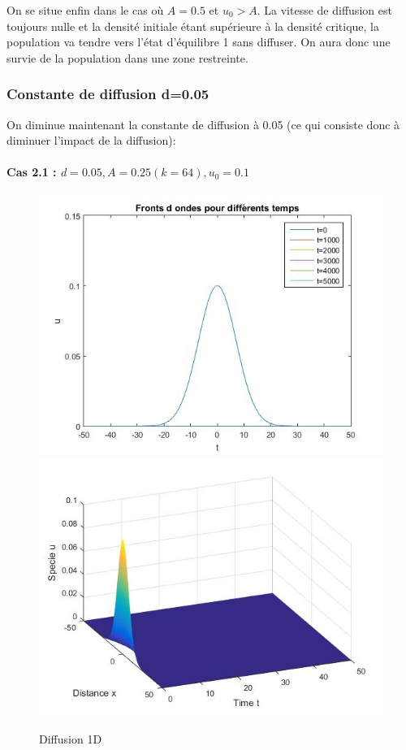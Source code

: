 \documentclass[a4paper,11pt]{article}
\begin{document}
On se situe enfin dans le cas où $A=0.5$ et $u_0>A$. La vitesse de diffusion est toujours nulle et la densité initiale étant supérieure à la densité critique, la population va tendre vers l'état d'équilibre 1 sans diffuser. On aura donc une survie de la population dans une zone restreinte.

\subsubsection{Constante de diffusion d=0.05}
On diminue maintenant la constante de diffusion à 0.05 (ce qui consiste donc à diminuer l'impact de la diffusion):

\paragraph{Cas 2.1 : $d=0.05, A=0.25 (k=64), u_0=0.1$}
\noindent
\begin{figure}[H]
	\centering
	\includegraphics[width=0.40\linewidth]{Allee/F2211}\hfill
	\includegraphics[width=0.55\linewidth]{Allee/F4211}
    \caption{Diffusion 1D}
\end{figure}
\noindent
\end{document}
